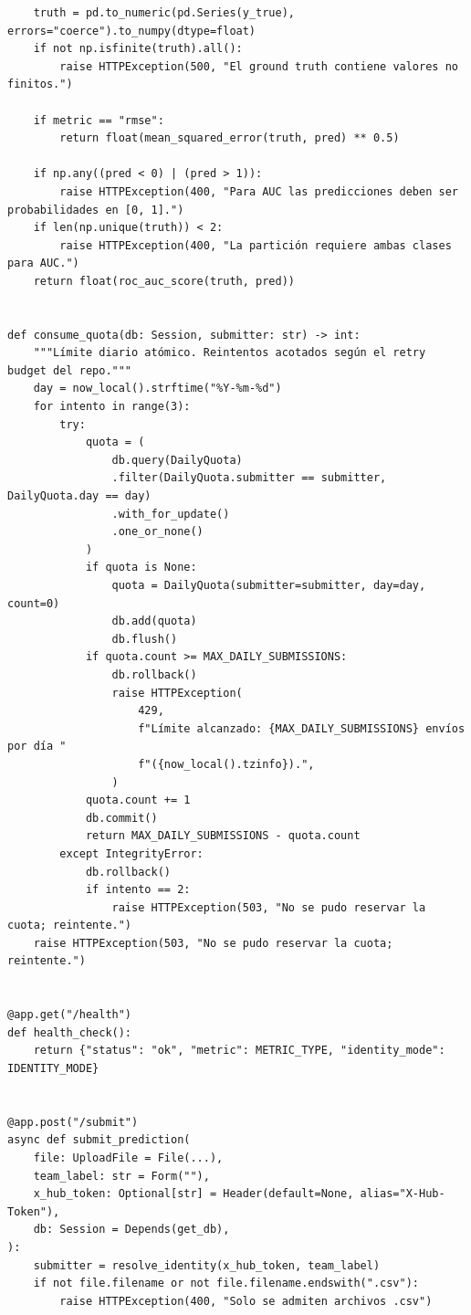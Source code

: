 \documentclass[11pt,a4paper]{article}
\begin{document}
\begin{lstlisting}
    truth = pd.to_numeric(pd.Series(y_true), errors="coerce").to_numpy(dtype=float)
    if not np.isfinite(truth).all():
        raise HTTPException(500, "El ground truth contiene valores no finitos.")

    if metric == "rmse":
        return float(mean_squared_error(truth, pred) ** 0.5)

    if np.any((pred < 0) | (pred > 1)):
        raise HTTPException(400, "Para AUC las predicciones deben ser probabilidades en [0, 1].")
    if len(np.unique(truth)) < 2:
        raise HTTPException(400, "La partición requiere ambas clases para AUC.")
    return float(roc_auc_score(truth, pred))


def consume_quota(db: Session, submitter: str) -> int:
    """Límite diario atómico. Reintentos acotados según el retry budget del repo."""
    day = now_local().strftime("%Y-%m-%d")
    for intento in range(3):
        try:
            quota = (
                db.query(DailyQuota)
                .filter(DailyQuota.submitter == submitter, DailyQuota.day == day)
                .with_for_update()
                .one_or_none()
            )
            if quota is None:
                quota = DailyQuota(submitter=submitter, day=day, count=0)
                db.add(quota)
                db.flush()
            if quota.count >= MAX_DAILY_SUBMISSIONS:
                db.rollback()
                raise HTTPException(
                    429,
                    f"Límite alcanzado: {MAX_DAILY_SUBMISSIONS} envíos por día "
                    f"({now_local().tzinfo}).",
                )
            quota.count += 1
            db.commit()
            return MAX_DAILY_SUBMISSIONS - quota.count
        except IntegrityError:
            db.rollback()
            if intento == 2:
                raise HTTPException(503, "No se pudo reservar la cuota; reintente.")
    raise HTTPException(503, "No se pudo reservar la cuota; reintente.")


@app.get("/health")
def health_check():
    return {"status": "ok", "metric": METRIC_TYPE, "identity_mode": IDENTITY_MODE}


@app.post("/submit")
async def submit_prediction(
    file: UploadFile = File(...),
    team_label: str = Form(""),
    x_hub_token: Optional[str] = Header(default=None, alias="X-Hub-Token"),
    db: Session = Depends(get_db),
):
    submitter = resolve_identity(x_hub_token, team_label)
    if not file.filename or not file.filename.endswith(".csv"):
        raise HTTPException(400, "Solo se admiten archivos .csv")


\end{lstlisting}
\end{document}
